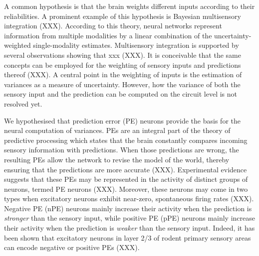\documentclass[10pt,a4paper,draft]{article}
\begin{document}
A common hypothesis is that the brain weights different inputs according to their reliabilities. A prominent example of this hypothesis is Bayesian multisensory integration (XXX). According to this theory, neural networks represent information from multiple modalities by a linear combination of the uncertainty-weighted single-modality estimates. Multisensory integration is supported by several observations showing that xxx (XXX). It is conceivable that the same concepts can be employed for the weighting of sensory inputs and predictions thereof (XXX). A central point in the weighting of inputs is the estimation of variances as a measure of uncertainty. However, how the variance of both the sensory input and the prediction can be computed on the circuit level is not resolved yet.  

We hypothesised that prediction error (PE) neurons provide the basis for the neural computation of variances. PEs are an integral part of the theory of predictive processing which states that the brain constantly compares incoming sensory information with predictions. When those predictions are wrong, the resulting PEs allow the network to revise the model of the world, thereby ensuring that the predictions are more accurate (XXX). Experimental evidence suggests that these PEs may be represented in the activity of distinct groups of neurons, termed PE neurons (XXX). Moreover, these neurons may come in two types when excitatory neurons exhibit near-zero, spontaneous firing rates (XXX). Negative PE (nPE) neurons mainly increase their activity when the prediction is \textit{stronger} than the sensory input, while positive PE (pPE) neurons mainly increase their activity when the prediction is \textit{weaker} than the sensory input. Indeed, it has been shown that excitatory neurons in layer 2/3 of rodent primary sensory areas can encode negative or positive PEs (XXX). 
\end{document}
